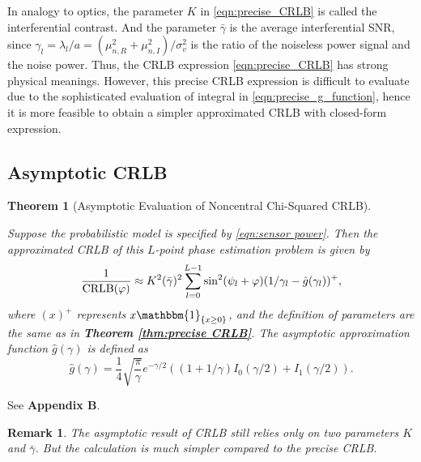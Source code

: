 \documentclass[12pt,draftclsnofoot,journal,onecolumn]{IEEEtran}
\newtheorem{theorem}{\bf Theorem}
\newtheorem{remark}{\bf Remark}
\theoremstyle{nonumberplain}
\begin{document}
    In analogy to optics, the parameter $K$ in \eqref{eqn:precise_CRLB} is called the interferential contrast. And the parameter $\bar{\gamma}$ is the average interferential SNR, since $\gamma_l=\lambda_l/a = (\mu_{n,R}^2+\mu_{n,I}^2)/\sigma_v^2$ is the ratio of the noiseless power signal and the noise power. Thus, the CRLB expression \eqref{eqn:precise_CRLB} has strong physical meanings. However, this precise CRLB expression is difficult to evaluate due to the sophisticated evaluation of integral in \eqref{eqn:precise_g_function}, hence it is more feasible to obtain a simpler approximated CRLB with closed-form expression. 

\subsection{Asymptotic CRLB}
    \begin{theorem}[Asymptotic Evaluation of Noncentral Chi-Squared CRLB] \label{thm:asymptotic CRLB} \mbox{}\par
        Suppose the probabilistic model is specified by \eqref{eqn:sensor power}. Then the approximated CRLB of this $L$-point phase estimation problem is given by 
        \begin{equation}
            \frac{1}{{\rm CRLB}(\varphi)}\approx K^2(\bar{\gamma})^2 \sum_{l=0}^{L-1}\sin^2(\psi_l+\varphi)(1/\gamma_l-\hat{g}(\gamma_l))^{+},
            \label{eqn:asymptotic CRLB}
        \end{equation}
        where $(x)^{+}$ represents ${x{\mathbbm{1}}_{\{x\geq 0\}}}$, and the definition of parameters are the same as in {\bf Theorem \ref{thm:precise CRLB}}. The asymptotic approximation function $\hat{g}(\gamma)$ is defined as 
        \begin{equation}
            \hat{g}(\gamma) = \frac{1}{4} \sqrt{\frac{\pi}{\gamma}}e^{-\gamma/2}\left((1+1/\gamma)I_0(\gamma/2) + I_1(\gamma/2)\right).
            \label{eqn:definition g function}
        \end{equation}
    \end{theorem}
    \begin{IEEEproof}
        See {\bf Appendix B}. 
    \end{IEEEproof}
    \begin{remark}
        The asymptotic result of CRLB still relies only on two parameters $K$ and $\bar{\gamma}$. But the calculation is much simpler compared to the precise CRLB. 
    \end{remark}
\end{document}
